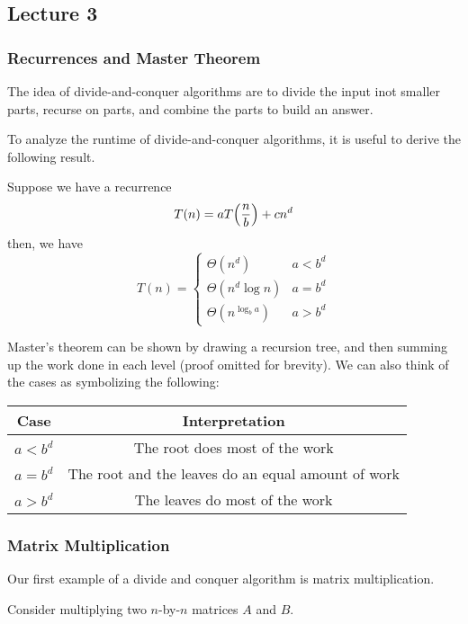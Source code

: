 \subsection{Lecture 3}

\subsubsection{Recurrences and Master Theorem}
The idea of divide-and-conquer algorithms are to
divide the input inot smaller parts, recurse on parts,
and combine the parts to build an answer.

To analyze the runtime of divide-and-conquer algorithms, it is
useful to derive the following result.

\begin{theorem} 
    Suppose we have a recurrence
    \[ T(n) = a T\qty(\frac{n}{b}) + cn^d \]
    then, we have
    \[ T(n) = \begin{cases}
        \Theta(n^d) & a < b^d \\
        \Theta(n^d \log n) & a = b^d \\
        \Theta(n^{\log_b a}) & a > b^d
    \end{cases} \]
\end{theorem}

Master's theorem can be shown by drawing a recursion tree,
and then summing up the work done in each level (proof omitted for brevity).
We can also think of the cases as symbolizing the following:

\begin{center}
\begin{tabular}{ c|c }
    Case & Interpretation \\ \hline
    $a < b^d$ & The root does most of the work \\ \hline
    $a = b^d$ & The root and the leaves do an equal amount of work \\ \hline
    $a > b^d$ & The leaves do most of the work \\ \hline
\end{tabular}
\end{center}

\subsubsection{Matrix Multiplication}
Our first example of a divide and conquer algorithm is matrix multiplication.

Consider multiplying two $n$-by-$n$ matrices $A$ and $B$.

